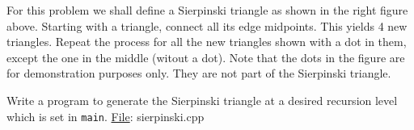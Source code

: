 \documentclass[addpoints]{exam}
\begin{document}
\begin{questions}
For this problem we shall define a Sierpinski triangle as shown in the right figure above. Starting with a triangle, connect all its edge midpoints. This yields 4 new triangles. Repeat the process for all the new triangles shown with a dot in them, except the one in the middle (witout a dot). Note that the dots in the figure are for demonstration purposes only. They are not part of the Sierpinski triangle.

Write a program to generate the Sierpinski triangle at a desired recursion level which is set in {\tt main}.
  \underline{File}: {sierpinski.cpp}
  
\end{questions}
\end{document}
